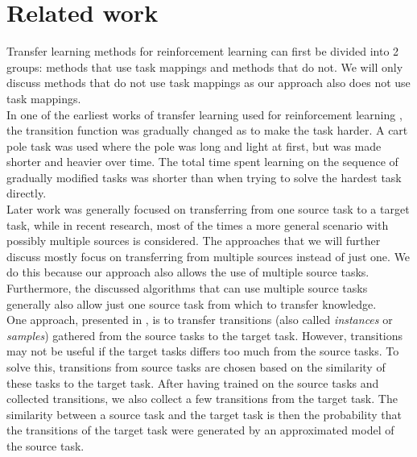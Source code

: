 \documentclass[a4paper, 11pt]{article}
\begin{document}
\section{Related work}




Transfer learning methods for reinforcement learning can first be divided into 2 groups: methods that use task mappings and methods that do not. We will only discuss methods that do not use task mappings as our approach also does not use task mappings.\\

In one of the earliest works of transfer learning used for reinforcement learning \citep{conf/ijcai/SelfridgeSB85}, the transition function was gradually changed as to make the task harder. A cart pole task was used where the pole was long and light at first, but was made shorter and heavier over time. The total time spent learning on the sequence of gradually modified tasks was shorter than when trying to solve the hardest task directly.\\

Later work was generally focused on transferring from one source task to a target task, while in recent research, most of the times a more general scenario with possibly multiple sources is considered. The approaches that we will further discuss mostly focus on transferring from multiple sources instead of just one. We do this because our approach also allows the use of multiple source tasks. Furthermore, the  discussed algorithms that can use multiple source tasks generally also allow just one source task from which to transfer knowledge.\\

One approach, presented in \cite{lazaric2008transfer}, is to transfer transitions (also called \textit{instances} or \textit{samples}) gathered from the source tasks to the target task. However, transitions may not be useful if the target tasks differs too much from the source tasks. To solve this, transitions from source tasks are chosen based on the similarity of these tasks to the target task. After having trained on the source tasks and collected transitions, we also collect a few transitions from the target task. The similarity between a source task and the target task is then the probability that the transitions of the target task were generated by an approximated model of the source task.
\end{document}
